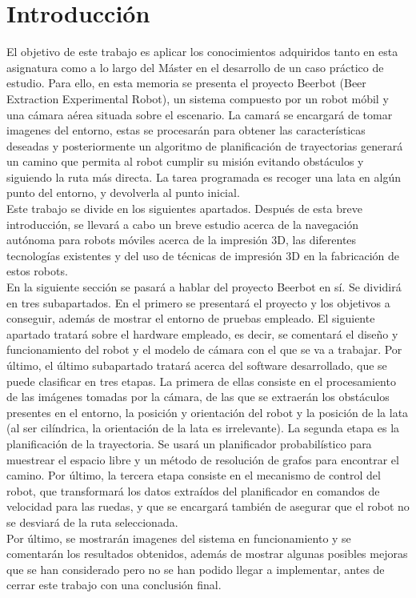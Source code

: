 \chapter{Introducción}
\label{introducción}

El objetivo de este trabajo es aplicar los conocimientos adquiridos tanto en esta asignatura como a lo largo del Máster en el desarrollo de un caso práctico de estudio. Para ello, en esta memoria se presenta el proyecto Beerbot (Beer Extraction Experimental Robot), un sistema compuesto por un robot móbil y una cámara aérea situada sobre el escenario. La camará se encargará de tomar imagenes del entorno, estas se procesarán para obtener las características deseadas y posteriormente un algoritmo de planificación de trayectorias generará un camino que permita al robot cumplir su misión evitando obstáculos y siguiendo la ruta más directa. La tarea programada es recoger una lata en algún punto del entorno, y devolverla al punto inicial.\\

Este trabajo se divide en los siguientes apartados. Después de esta breve introducción, se llevará a cabo un breve estudio acerca de la navegación autónoma para robots móviles acerca de la impresión 3D, las diferentes tecnologías existentes y del uso de técnicas de impresión 3D en la fabricación de estos robots.\\

En la siguiente sección se pasará a hablar del proyecto Beerbot en sí. Se dividirá en tres subapartados. En el primero se presentará el proyecto y los objetivos a conseguir, además de mostrar el entorno de pruebas empleado. El siguiente apartado tratará sobre el hardware empleado, es decir, se comentará el diseño y funcionamiento del robot y el modelo de cámara con el que se va a trabajar. Por último, el último subapartado tratará acerca del software desarrollado, que se puede clasificar en tres etapas. La primera de ellas consiste en el procesamiento de las imágenes tomadas por la cámara, de las que se extraerán los obstáculos presentes en el entorno, la posición y orientación del robot y la posición de la lata (al ser cilíndrica, la orientación de la lata es irrelevante). La segunda etapa es la planificación de la trayectoria. Se usará un planificador probabilístico para muestrear el espacio libre y un método de resolución de grafos para encontrar el camino. Por último, la tercera etapa consiste en el mecanismo de control del robot, que transformará los datos extraídos del planificador en comandos de velocidad para las ruedas, y que se encargará también de asegurar que el robot no se desviará de la ruta seleccionada.\\

Por último, se mostrarán imagenes del sistema en funcionamiento y se comentarán los resultados obtenidos, además de mostrar algunas posibles mejoras que se han considerado pero no se han podido llegar a implementar, antes de cerrar este trabajo con una conclusión final.\\
